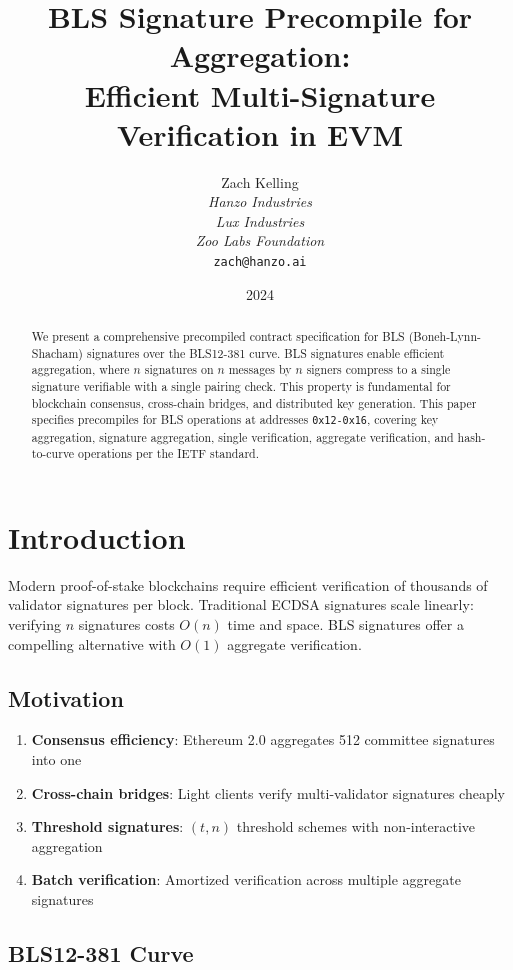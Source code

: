 \documentclass[11pt,a4paper]{article}
\title{BLS Signature Precompile for Aggregation:\\Efficient Multi-Signature Verification in EVM}
\author{Zach Kelling\\
\textit{Hanzo Industries}\\
\textit{Lux Industries}\\
\textit{Zoo Labs Foundation}\\
\texttt{zach@hanzo.ai}}
\date{2024}
\theoremstyle{definition}
\begin{document}
\maketitle

\begin{abstract}
We present a comprehensive precompiled contract specification for BLS (Boneh-Lynn-Shacham) signatures over the BLS12-381 curve. BLS signatures enable efficient aggregation, where $n$ signatures on $n$ messages by $n$ signers compress to a single signature verifiable with a single pairing check. This property is fundamental for blockchain consensus, cross-chain bridges, and distributed key generation. This paper specifies precompiles for BLS operations at addresses \texttt{0x12-0x16}, covering key aggregation, signature aggregation, single verification, aggregate verification, and hash-to-curve operations per the IETF standard.
\end{abstract}

\section{Introduction}

Modern proof-of-stake blockchains require efficient verification of thousands of validator signatures per block. Traditional ECDSA signatures scale linearly: verifying $n$ signatures costs $O(n)$ time and space. BLS signatures offer a compelling alternative with $O(1)$ aggregate verification.

\subsection{Motivation}

\begin{enumerate}
    \item \textbf{Consensus efficiency}: Ethereum 2.0 aggregates 512 committee signatures into one
    \item \textbf{Cross-chain bridges}: Light clients verify multi-validator signatures cheaply
    \item \textbf{Threshold signatures}: $(t, n)$ threshold schemes with non-interactive aggregation
    \item \textbf{Batch verification}: Amortized verification across multiple aggregate signatures
\end{enumerate}

\subsection{BLS12-381 Curve}
\end{document}
